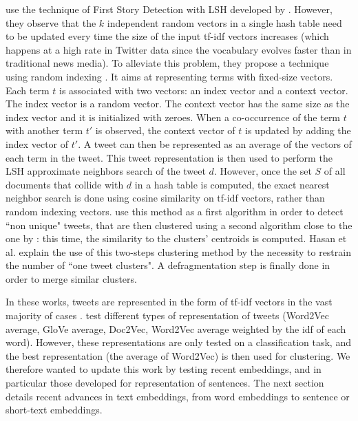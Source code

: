 \citet{hasan_twitternews_2016} use the technique of First Story Detection with LSH developed by \citet{petrovic_streaming_2010}. However, they observe that the $k$ independent random vectors in a single hash table need to be updated every time the size of the input tf-idf vectors increases (which happens at a high rate in Twitter data since the vocabulary evolves faster than in traditional news media). To alleviate this problem, they propose a technique using random indexing \citep{sahlgren_introduction_2005}. It  aims at representing terms with fixed-size vectors. Each term $t$ is associated with two vectors: an index vector and a context vector. The index vector is a random vector. The context vector has the same size as the index vector and it is initialized with zeroes. When a co-occurrence of the term $t$ with another term $t'$ is observed, the context vector of $t$ is updated by adding the index vector of $t'$. A tweet can then be represented as an average of the vectors of each term in the tweet. This tweet representation is then used to perform the LSH approximate neighbors search of the tweet $d$. However, once the set $S$ of all documents that collide with $d$ in a hash table is computed, the exact nearest neighbor search is done using cosine similarity on tf-idf vectors, rather than random indexing vectors. \citet{hasan_twitternews_2016} use this method as a first algorithm in order to detect ``non unique" tweets, that are then clustered using a second algorithm close to the one by \citet{sankaranarayanan_twitterstand:_2009}: this time, the similarity to the clusters' centroids is computed. Hasan et al. explain the use of this two-steps clustering method by the necessity to restrain the number of ``one tweet clusters". A defragmentation step is finally done in order to merge similar clusters.


In these works, tweets are represented in the form of tf-idf vectors in the vast majority of cases \citep{sankaranarayanan_twitterstand:_2009, petrovic_streaming_2010, becker_automatic_2011, hasan_twitternews_2016}. \citet{repp_extracting_2018} test different types of representation of tweets (Word2Vec average, GloVe average, Doc2Vec, Word2Vec average weighted by the idf of each word). However, these representations are only tested on a classification task, and the best representation (the average of Word2Vec) is then used for clustering. We therefore wanted to update this work by testing recent embeddings, and in particular those developed for representation of sentences. The next section details recent advances in text embeddings, from word embeddings to sentence or short-text embeddings.

